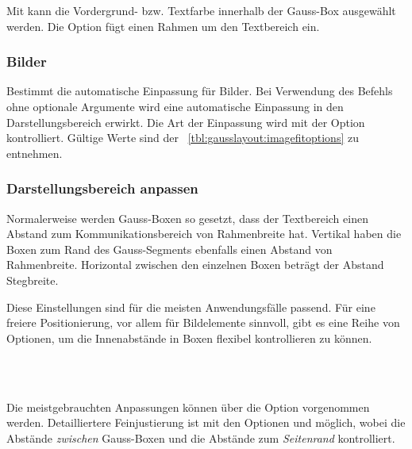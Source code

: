 Mit  kann die Vordergrund- bzw. Textfarbe
innerhalb der Gauss-Box ausgewählt werden.
Die Option  fügt einen Rahmen um den Textbereich
ein.%


\subsubsection{Bilder}

\begin{Declaration}
\end{Declaration}

Bestimmt die automatische Einpassung für Bilder.
Bei Verwendung des Befehls  ohne optionale
Argumente wird eine automatische Einpassung in den Darstellungsbereich
erwirkt.
Die Art der Einpassung wird mit der Option  kontrolliert.
Gültige Werte sind der \tablename~\ref{tbl:gausslayout:imagefitoptions}
zu entnehmen.


\subsubsection{Darstellungsbereich anpassen}

Normalerweise werden Gauss-Boxen so gesetzt, dass der Textbereich
einen Abstand zum Kommunikationsbereich von Rahmenbreite hat.
Vertikal haben die Boxen zum Rand des Gauss-Segments ebenfalls einen
Abstand von Rahmenbreite.
Horizontal zwischen den einzelnen Boxen beträgt der Abstand Stegbreite.

Diese Einstellungen sind für die meisten Anwendungsfälle passend.
Für eine freiere Positionierung, vor allem für Bildelemente sinnvoll, gibt
es eine Reihe von Optionen, um die Innenabstände in Boxen flexibel
kontrollieren zu können.

\begin{Declaration}
  \\
  \\
\end{Declaration}

Die meistgebrauchten Anpassungen können über die Option 
vorgenommen werden.
Detailliertere Feinjustierung ist mit den Optionen 
und  möglich,
wobei  die Abstände \emph{zwischen} Gauss-Boxen
und  die Abstände zum \emph{Seitenrand} kontrolliert.

